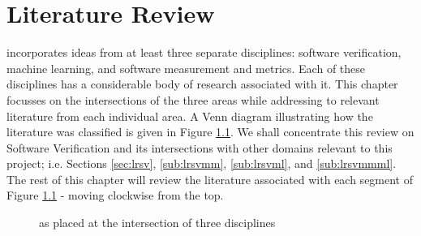 \chapter{Literature Review}%
\thispagestyle{nohead}
\label{LitReview} %


\where incorporates ideas from at least three separate disciplines: software verification, machine learning, and software measurement and metrics. Each of these disciplines has a considerable body of research associated with it. This chapter focusses on the intersections of the three areas while addressing to relevant literature from each individual area.
A Venn diagram illustrating how the literature was classified is given in Figure \ref{fig:litreview}. 
We shall concentrate this review on Software Verification and its intersections with other domains relevant to this project; i.e. Sections \ref{sec:lrsv}, \ref{sub:lrsvmm}, \ref{sub:lrsvml}, and \ref{sub:lrsvmmml}. 
The rest of this chapter will review the literature associated with each segment of Figure \ref{fig:litreview} - moving clockwise from the top.


\begin{figure}

\centering
\def\firstcircle{(3cm,0cm) circle (2.5cm)}
\def\secondcircle{(0cm,0cm) circle (2.5cm)}
\def\thirdcircle{(1.5cm,3cm) circle (2.5cm)}

\caption{\where as placed at the intersection of three disciplines}
\label{fig:litreview}

\end{figure}



